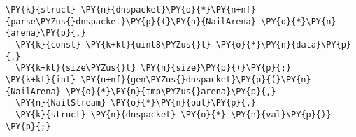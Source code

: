 \begin{Verbatim}[commandchars=\\\{\},codes={\catcode`\$=3\catcode`\^=7\catcode`\_=8}]
\PY{k}{struct} \PY{n}{dnspacket}\PY{o}{*}\PY{n+nf}{parse\PYZus{}dnspacket}\PY{p}{(}\PY{n}{NailArena} \PY{o}{*}\PY{n}{arena}\PY{p}{,} 
  \PY{k}{const} \PY{k+kt}{uint8\PYZus{}t} \PY{o}{*}\PY{n}{data}\PY{p}{,} 
  \PY{k+kt}{size\PYZus{}t} \PY{n}{size}\PY{p}{)}\PY{p}{;}
\PY{k+kt}{int} \PY{n+nf}{gen\PYZus{}dnspacket}\PY{p}{(}\PY{n}{NailArena} \PY{o}{*}\PY{n}{tmp\PYZus{}arena}\PY{p}{,}
  \PY{n}{NailStream} \PY{o}{*}\PY{n}{out}\PY{p}{,}
  \PY{k}{struct} \PY{n}{dnspacket} \PY{o}{*} \PY{n}{val}\PY{p}{)} \PY{p}{;}
\end{Verbatim}
